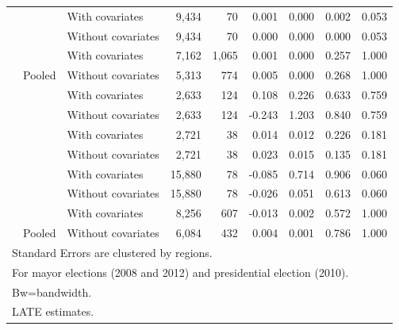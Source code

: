 \documentclass[
  12pt,
]{article}
\begin{document}
\begin{table}[H]
\begin{tabular}[t]{lllrrrrrr}
 &  & With covariates & 9,434 & 70 & 0.001 & 0.000 & 0.002 & 0.053\\


 & \multirow{-2}{*}{\raggedright\arraybackslash 60000} & Without covariates & 9,434 & 70 & 0.000 & 0.000 & 0.000 & 0.053\\


 &  & With covariates & 7,162 & 1,065 & 0.001 & 0.000 & 0.257 & 1.000\\


\multirow{-8}{*}{\raggedright\arraybackslash 2010} & \multirow{-2}{*}{\raggedright\arraybackslash Pooled} & Without covariates & 5,313 & 774 & 0.005 & 0.000 & 0.268 & 1.000\\

\cmidrule{1-9}
 &  & With covariates & 2,633 & 124 & 0.108 & 0.226 & 0.633 & 0.759\\


 & \multirow{-2}{*}{\raggedright\arraybackslash 20000} & Without covariates & 2,633 & 124 & -0.243 & 1.203 & 0.840 & 0.759\\


 &  & With covariates & 2,721 & 38 & 0.014 & 0.012 & 0.226 & 0.181\\


 & \multirow{-2}{*}{\raggedright\arraybackslash 40000} & Without covariates & 2,721 & 38 & 0.023 & 0.015 & 0.135 & 0.181\\


 &  & With covariates & 15,880 & 78 & -0.085 & 0.714 & 0.906 & 0.060\\


 & \multirow{-2}{*}{\raggedright\arraybackslash 60000} & Without covariates & 15,880 & 78 & -0.026 & 0.051 & 0.613 & 0.060\\


 &  & With covariates & 8,256 & 607 & -0.013 & 0.002 & 0.572 & 1.000\\


\multirow{-8}{*}{\raggedright\arraybackslash 2012} & \multirow{-2}{*}{\raggedright\arraybackslash Pooled} & Without covariates & 6,084 & 432 & 0.004 & 0.001 & 0.786 & 1.000\\
\bottomrule
\multicolumn{9}{l}{\rule{0pt}{1em}Standard Errors are clustered by regions.}\\
\multicolumn{9}{l}{\rule{0pt}{1em}For mayor elections (2008 and 2012) and presidential election (2010).}\\
\multicolumn{9}{l}{\rule{0pt}{1em}Bw=bandwidth.}\\
\multicolumn{9}{l}{\rule{0pt}{1em}LATE estimates.}\\
\end{tabular}
\end{table}
\end{document}

